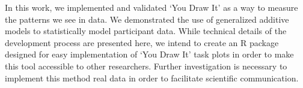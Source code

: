 \documentclass[12pt]{article}
\begin{document}
In this work, we implemented and validated `You Draw It' as a way to
measure the patterns we see in data. We demonstrated the use of
generalized additive models to statistically model participant data.
While technical details of the development process are presented here,
we intend to create an R package designed for easy implementation of
`You Draw It' task plots in order to make this tool accessible to other
researchers. Further investigation is necessary to implement this method
real data in order to facilitate scientific communication.



\end{document}
